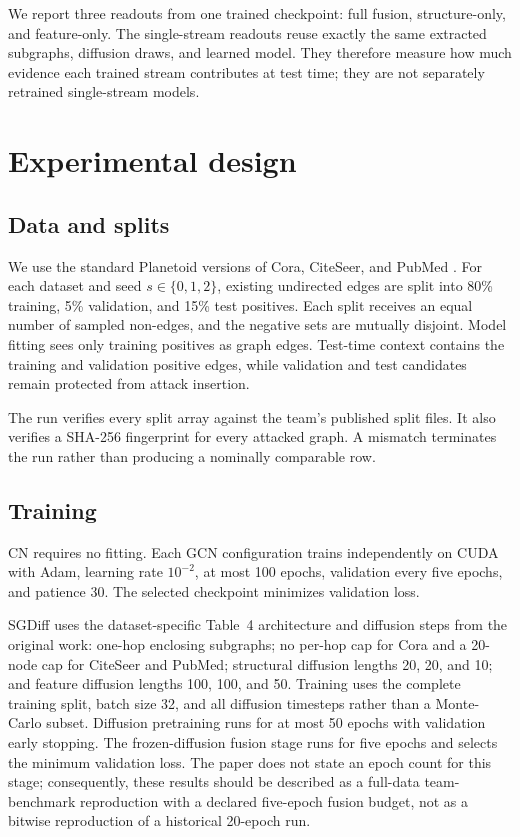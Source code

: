 \documentclass[11pt]{article}
\begin{document}
We report three readouts from one trained checkpoint: full fusion,
structure-only, and feature-only. The single-stream readouts reuse exactly the
same extracted subgraphs, diffusion draws, and learned model. They therefore
measure how much evidence each trained stream contributes at test time; they
are not separately retrained single-stream models.

\section{Experimental design}
\subsection{Data and splits}
We use the standard Planetoid versions of Cora, CiteSeer, and PubMed
\citep{yang2016planetoid}. For each dataset and seed $s\in\{0,1,2\}$, existing
undirected edges are split into 80\% training, 5\% validation, and 15\% test
positives. Each split receives an equal number of sampled non-edges, and the
negative sets are mutually disjoint. Model fitting sees only training
positives as graph edges. Test-time context contains the training and
validation positive edges, while validation and test candidates remain
protected from attack insertion.

The run verifies every split array against the team's published split files.
It also verifies a SHA-256 fingerprint for every attacked graph. A mismatch
terminates the run rather than producing a nominally comparable row.

\subsection{Training}
CN requires no fitting. Each GCN configuration trains independently on CUDA
with Adam, learning rate $10^{-2}$, at most 100 epochs, validation every five
epochs, and patience 30. The selected checkpoint minimizes validation loss.

SGDiff uses the dataset-specific Table~4 architecture and diffusion steps from
the original work: one-hop enclosing subgraphs; no per-hop cap for Cora and a
20-node cap for CiteSeer and PubMed; structural diffusion lengths 20, 20, and
10; and feature diffusion lengths 100, 100, and 50. Training uses the complete
training split, batch size 32, and all diffusion timesteps rather than a
Monte-Carlo subset. Diffusion pretraining runs for at most 50 epochs with
validation early stopping. The frozen-diffusion fusion stage runs for five
epochs and selects the minimum validation loss. The paper does not state an
epoch count for this stage; consequently, these results should be described as
a full-data team-benchmark reproduction with a declared five-epoch fusion
budget, not as a bitwise reproduction of a historical 20-epoch run.
\end{document}
